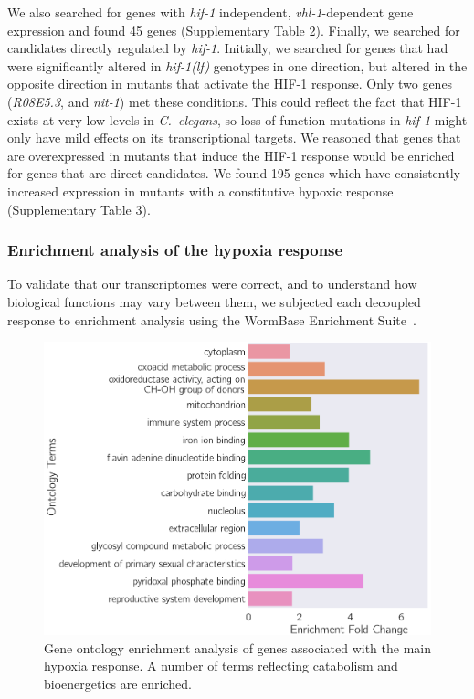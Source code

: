 \documentclass[10pt, onecolumn]{article}
\newcommand{\cel}{\emph{C.~elegans}}
\newcommand{\gene}[1]{\emph{#1}}
\newcommand{\hif}{\emph{\mbox{hif-1(lf)}}}
\newcommand{\hifp}{HIF-1}
\newcommand{\vhltargets}{45} %
\newcommand{\hiftargets}{195}
\begin{document}
We also searched for genes with \gene{hif-1} independent, \gene{vhl-1}-dependent gene
expression and found \vhltargets{} genes (Supplementary Table 2).
Finally, we searched for candidates directly regulated by \gene{hif-1}. Initially, we
searched for genes that had were significantly altered in \hif{} genotypes in one
direction, but altered in the opposite direction in mutants that activate the
\hifp{} response. Only two genes (\emph{R08E5.3}, and \emph{nit-1}) met these
conditions. This could reflect the fact that \hifp{} exists at very low
levels in \cel{}, so loss of function mutations in \gene{hif-1} might only have
mild effects on its transcriptional targets. We reasoned that genes
that are overexpressed in mutants that induce the \hifp{} response would be enriched
for genes that are direct candidates.  We found \hiftargets{}  genes which have
consistently increased expression in mutants with a constitutive hypoxic response
(Supplementary Table 3).


\subsubsection*{Enrichment analysis of the hypoxia response}
\label{sub:ea_hypoxia}
To validate that our transcriptomes were correct, and to understand how
biological functions may vary between them, we subjected each decoupled response to
enrichment analysis using the WormBase Enrichment Suite~\cite{Angeles-Albores2016,
Angeles-Albores2016b}.

\begin{figure}[tbhp]
\centering
\includegraphics[width=.5\linewidth]{../figs/hypoxia_response_gea.pdf}
\caption{
Gene ontology enrichment analysis of genes associated with the main hypoxia response.
A number of terms reflecting catabolism and bioenergetics are enriched.
}
\label{fig:hyp_gea}
\end{figure}
\end{document}
